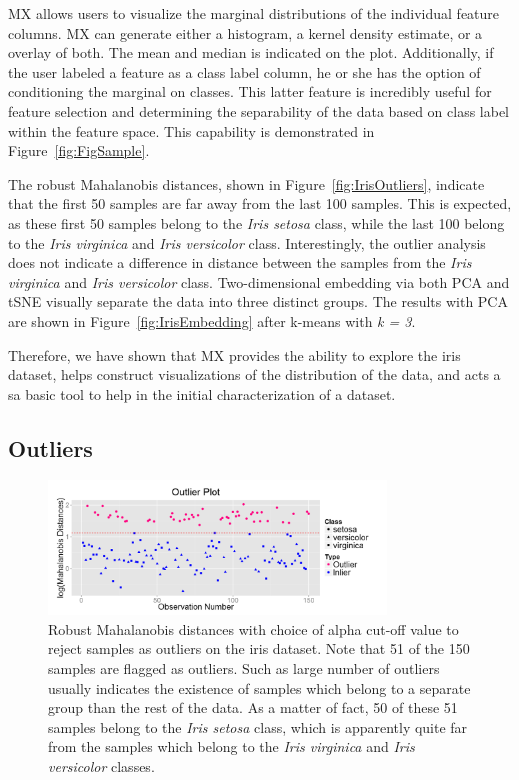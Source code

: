 \documentclass[12pt]{article}
\begin{document}
MX allows users to visualize the marginal distributions of the individual feature columns. MX can generate either a histogram, a kernel density estimate, or a overlay of both. The mean and median is indicated on the plot. Additionally, if the user labeled a feature as a class label column, he or she has the option of conditioning the marginal on classes. This latter feature is incredibly useful for feature selection and determining the separability of the data based on class label within the feature space. This capability is demonstrated in Figure~\ref{fig:FigSample}. 

The robust Mahalanobis distances, shown in  Figure~\ref{fig:IrisOutliers}, indicate that the first 50 samples are far away from the last 100 samples. This is expected, as these first 50 samples belong to the \textit{Iris setosa} class, while the last 100 belong to the \textit{Iris virginica} and \textit{Iris versicolor} class. Interestingly, the outlier analysis does not indicate a difference in distance between the samples from the \textit{Iris virginica} and \textit{Iris versicolor} class. Two-dimensional embedding via both PCA and tSNE visually separate the data into three distinct groups. The results with PCA are shown in Figure~\ref{fig:IrisEmbedding} after k-means with \textit{k = 3}.

Therefore, we have shown that MX provides the ability to explore the iris dataset, helps construct visualizations of the distribution of the data, and acts a sa basic tool to help in the initial characterization of a dataset.

\subsection{Outliers}
\label{subsec:SubSecOutliers}

\begin{figure}[t!]
	\centering
	\includegraphics[width=0.8\textwidth]{Figures/Iris/OutliersIris.png}
	\caption{Robust Mahalanobis distances with choice of alpha cut-off value to reject samples as outliers on the iris dataset. Note that 51 of the 150 samples are flagged as outliers. Such as large number of outliers usually indicates the existence of samples which belong to a separate group than the rest of the data. As a matter of fact, 50 of these 51 samples belong to the \textit{Iris setosa} class, which is apparently quite far from the samples which belong to the \textit{Iris virginica} and \textit{Iris versicolor} classes.}
	\label{fig:FigOutliers}
\end{figure}
\end{document}
